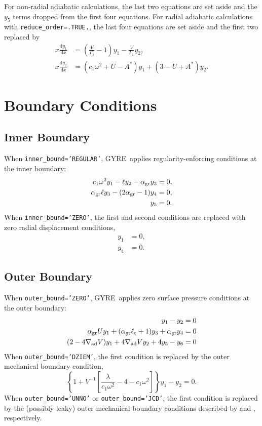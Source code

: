 \documentclass[fleqn]{article}
\newcommand{\gyre}{GYRE}
\newcommand{\diff}{\mathrm{d}}
\newcommand{\elle}{\ell_{\rm e}}
\newcommand{\Vg}{\frac{V}{\Gamma_{1}}}
\newcommand{\As}{A^{\ast}}
\newcommand{\nabad}{\nabla_{\rm ad}}
\newcommand{\agr}{\alpha_{\rm gr}}
\begin{document}
For non-radial adiabatic calculations, the last two equations are set
aside and the $y_{5}$ terms dropped from the first four equations. For
radial adiabatic calculations with \texttt{reduce\_order=.TRUE.}, the
last four equations are set aside and the first two replaced by
\begin{align*}
x \frac{\diff y_{1}}{\diff x} &=
\left(\Vg - 1 \right) y_{1} 
- \Vg y_{2}, \\
x \frac{\diff y_{2}}{\diff x} &=
(c_{1} \omega^{2} + U - \As ) y_{1} +
(3 - U + \As) y_{2}.
\end{align*}

\section*{Boundary Conditions}

\subsection*{Inner Boundary}

When \texttt{inner\_bound='REGULAR'}, \gyre\ applies
regularity-enforcing conditions at the inner boundary:
\begin{align*}
c_{1} \omega^{2} y_{1} - \ell y_{2} - \agr y_{3} &= 0, \\
\agr \ell y_{3} - (2\agr - 1) y_{4} &= 0, \\
y_{5} &= 0.
\end{align*}
When \texttt{inner\_bound='ZERO'}, the first and second conditions are replaced with zero radial displacement conditions,
\begin{align*}
y_{1} &= 0, \\
y_{4} &= 0.
\end{align*}

\subsection*{Outer Boundary}
 
When \texttt{outer\_bound='ZERO'}, \gyre\ applies zero surface
pressure conditions at the outer boundary:
\begin{align*}
y_{1} - y_{2} &= 0 \\
\agr U y_{1} + (\agr \elle + 1) y_{3} + \agr y_{4} &= 0 \\
(2 - 4\nabad V) y_{1} + 4 \nabad V y_{2} + 4 y_{5} - y_{6} &= 0
\end{align*}
When \texttt{outer\_bound='DZIEM'}, the first condition is replaced by
the \citet{Dziembowski:1971aa} outer mechanical boundary condition,
\begin{equation*}
\left\{ 1 + V^{-1} \left[ \frac{\lambda}{c_{1} \omega^{2}} - 4 - c_{1} \omega^{2} \right] \right\} y_{1} -
y_{2} = 0.
\end{equation*}
When \texttt{outer\_bound='UNNO'} or \texttt{outer\_bound='JCD'}, the
first condition is replaced by the (possibly-leaky) outer mechanical
boundary conditions described by \citet{Unno:1989aa} and
\citet{Christensen-Dalsgaard:2008ab}, respectively.
  
\end{document}
